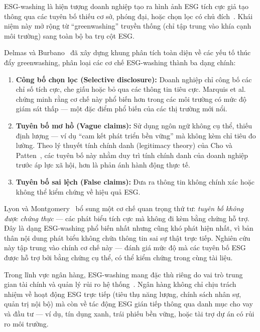 ESG-washing là hiện tượng doanh nghiệp tạo ra hình ảnh ESG tích cực giả tạo thông qua các tuyên bố thiếu cơ sở, phóng đại, hoặc chọn lọc có chủ đích~\cite{delmas2011drivers, lyon2015means}. Khái niệm này mở rộng từ ``greenwashing'' truyền thống (chỉ tập trung vào khía cạnh môi trường) sang toàn bộ ba trụ cột ESG.

Delmas và Burbano~\cite{delmas2011drivers} đã xây dựng khung phân tích toàn diện về các yếu tố thúc đẩy greenwashing, phân loại các cơ chế ESG-washing thành ba dạng chính:

\begin{enumerate}
    \item \textbf{Công bố chọn lọc (Selective disclosure):} Doanh nghiệp chỉ công bố các chỉ số tích cực, che giấu hoặc bỏ qua các thông tin tiêu cực. Marquis et al.~\cite{marquis2016scrutiny} chứng minh rằng cơ chế này phổ biến hơn trong các môi trường có mức độ giám sát thấp — một đặc điểm phổ biến của các thị trường mới nổi.
    \item \textbf{Tuyên bố mơ hồ (Vague claims):} Sử dụng ngôn ngữ không cụ thể, thiếu định lượng --- ví dụ ``cam kết phát triển bền vững'' mà không kèm chỉ tiêu đo lường. Theo lý thuyết tính chính danh (legitimacy theory) của Cho và Patten~\cite{cho2007role}, các tuyên bố này nhằm duy trì tính chính danh của doanh nghiệp trước áp lực xã hội, hơn là phản ánh hành động thực tế.
    \item \textbf{Tuyên bố sai lệch (False claims):} Đưa ra thông tin không chính xác hoặc không thể kiểm chứng về hiệu quả ESG.
\end{enumerate}

Lyon và Montgomery~\cite{lyon2015means} bổ sung một cơ chế quan trọng thứ tư: \textit{tuyên bố không được chứng thực} --- các phát biểu tích cực mà không đi kèm bằng chứng hỗ trợ. Đây là dạng ESG-washing phổ biến nhất nhưng cũng khó phát hiện nhất, vì bản thân nội dung phát biểu không chứa thông tin sai sự thật trực tiếp. Nghiên cứu này tập trung vào chính cơ chế này --- đánh giá mức độ mà các tuyên bố ESG được hỗ trợ bởi bằng chứng cụ thể, có thể kiểm chứng trong cùng tài liệu.

Trong lĩnh vực ngân hàng, ESG-washing mang đặc thù riêng do vai trò trung gian tài chính và quản lý rủi ro hệ thống~\cite{lagasio2024esg}. Ngân hàng không chỉ chịu trách nhiệm về hoạt động ESG trực tiếp (tiêu thụ năng lượng, chính sách nhân sự, quản trị nội bộ) mà còn về tác động ESG gián tiếp thông qua danh mục cho vay và đầu tư --- ví dụ, tín dụng xanh, trái phiếu bền vững, hoặc tài trợ dự án có rủi ro môi trường.


